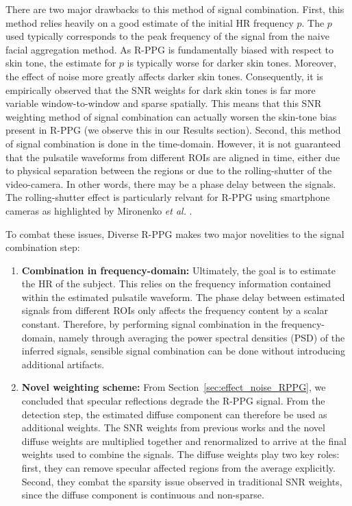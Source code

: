 There are two major drawbacks to this method of signal combination. First, this method relies heavily on a good estimate of the initial HR frequency $p$. The $p$ used typically corresponds to the peak frequency of the signal from the naive facial aggregation method. As R-PPG is fundamentally biased with respect to skin tone, the estimate for $p$ is typically worse for darker skin tones. Moreover, the effect of noise more greatly affects darker skin tones. Consequently, it is empirically observed that the SNR weights for dark skin tones is far more variable window-to-window and sparse spatially. This means that this SNR weighting method of signal combination can actually worsen the skin-tone bias present in R-PPG (we observe this in our Results section). Second, this method of signal combination is done in the time-domain. However, it is not guaranteed that the pulsatile waveforms from different ROIs are aligned in time, either due to physical separation between the regions or due to the rolling-shutter of the video-camera. In other words, there may be a phase delay between the signals. The rolling-shutter effect is particularly relvant for R-PPG using smartphone cameras as highlighted by Mironenko \textit{et al.} \cite{mironenko_remote_2020}. 

To combat these issues, Diverse R-PPG makes two major novelities to the signal combination step: 
\begin{enumerate}[label=(\roman*)]
    \item \textbf{Combination in frequency-domain:} Ultimately, the goal is to estimate the HR of the subject. This relies on the frequency information contained within the estimated pulsatile waveform. The phase delay between estimated signals from different ROIs only affects the frequency content by a scalar constant. Therefore, by performing signal combination in the frequency-domain, namely through averaging the power spectral densities (PSD) of the inferred signals, sensible signal combination can be done without introducing additional artifacts. 
    \item \textbf{Novel weighting scheme:} From Section~\ref{sec:effect_noise_RPPG}, we concluded that specular reflections degrade the R-PPG signal. From the detection step, the estimated diffuse component can therefore be used as additional weights. The SNR weights from previous works and the novel diffuse weights are multiplied together and renormalized to arrive at the final weights used to combine the signals. The diffuse weights play two key roles: first, they can remove specular affected regions from the average explicitly. Second, they combat the sparsity issue observed in traditional SNR weights, since the diffuse component is continuous and non-sparse. 
\end{enumerate}


